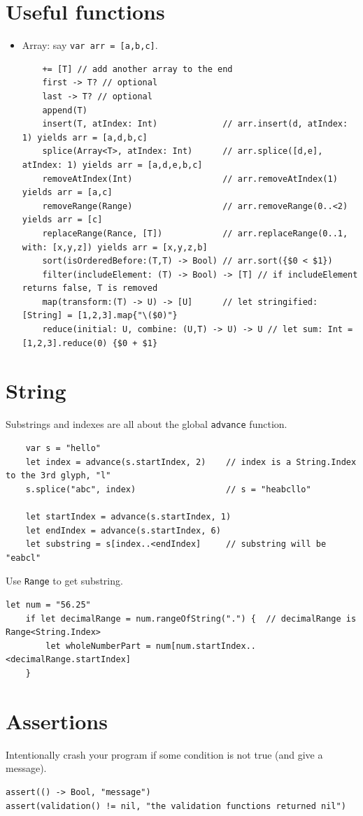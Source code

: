 \documentclass[12pt]{report}
\newcommand{\co}{\texttt}
\begin{document}
\section{Useful functions}
\begin{itemize}
	\item Array: say \co{var arr = [a,b,c]}.
	\begin{lstlisting}
	+= [T] // add another array to the end
	first -> T? // optional
	last -> T? // optional
	append(T)
	insert(T, atIndex: Int)				// arr.insert(d, atIndex: 1) yields arr = [a,d,b,c]
	splice(Array<T>, atIndex: Int)		// arr.splice([d,e], atIndex: 1) yields arr = [a,d,e,b,c]
	removeAtIndex(Int)					// arr.removeAtIndex(1) yields arr = [a,c]
	removeRange(Range)					// arr.removeRange(0..<2) yields arr = [c]
	replaceRange(Rance, [T])			// arr.replaceRange(0..1, with: [x,y,z]) yields arr = [x,y,z,b]
	sort(isOrderedBefore:(T,T) -> Bool)	// arr.sort({$0 < $1})
	filter(includeElement: (T) -> Bool) -> [T] // if includeElement returns false, T is removed
	map(transform:(T) -> U) -> [U]		// let stringified: [String] = [1,2,3].map{"\($0)"}
	reduce(initial: U, combine: (U,T) -> U) -> U // let sum: Int = [1,2,3].reduce(0) {$0 + $1}
	\end{lstlisting}
\end{itemize}

\section{String}
Substrings and indexes are all about the global \co{advance} function.
\begin{lstlisting}
	var s = "hello"
	let index = advance(s.startIndex, 2)	// index is a String.Index to the 3rd glyph, "l"
	s.splice("abc", index)					// s = "heabcllo"

	let startIndex = advance(s.startIndex, 1)
	let endIndex = advance(s.startIndex, 6)
	let substring = s[index..<endIndex] 	// substring will be "eabcl"

\end{lstlisting}

Use \co{Range} to get substring.
\begin{lstlisting}
let num = "56.25"
	if let decimalRange = num.rangeOfString(".") {	// decimalRange is Range<String.Index>
		let wholeNumberPart = num[num.startIndex..<decimalRange.startIndex]
	}
\end{lstlisting}

\section{Assertions}
Intentionally crash your program if some condition is not true (and give a message).
\begin{lstlisting}
assert(() -> Bool, "message")
assert(validation() != nil, "the validation functions returned nil")
\end{lstlisting}
\end{document}
